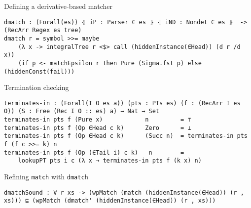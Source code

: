 \documentclass{beamer}
\newcommand{\Agda}[1]{\texttt{\footnotesize #1}\xspace}
\newcommand{\match}{\Agda{match}}
\begin{document}
\begin{frame}[fragile]{Defining a derivative-based matcher}
\begin{verbatim}
dmatch : (Forall(es)) ⦃ iP : Parser ∈ es ⦄ ⦃ iND : Nondet ∈ es ⦄  -> (RecArr Regex es tree)
dmatch r = symbol >>= maybe
    (λ x -> integralTree r <$> call (hiddenInstance(∈Head)) (d r /d x))
    (if p <- matchEpsilon r then Pure (Sigma.fst p) else (hiddenConst(fail)))
\end{verbatim}
\end{frame}


\begin{frame}[fragile]{Termination checking}
\begin{verbatim}
terminates-in : (Forall(I O es a)) (pts : PTs es) (f : (RecArr I es O)) (S : Free (Rec I O :: es) a) → Nat → Set
terminates-in pts f (Pure x)            n         = ⊤
terminates-in pts f (Op ∈Head c k)      Zero      = ⊥
terminates-in pts f (Op ∈Head c k)      (Succ n)  = terminates-in pts f (f c >>= k) n
terminates-in pts f (Op (∈Tail i) c k)   n        =
    lookupPT pts i c (λ x → terminates-in pts f (k x) n)
\end{verbatim}
\end{frame}


\begin{frame}[fragile]{Refining \match with \Agda{dmatch}}
\begin{verbatim}
dmatchSound : ∀ r xs -> (wpMatch (match (hiddenInstance(∈Head)) (r , xs))) ⊑ (wpMatch (dmatch' (hiddenInstance(∈Head)) (r , xs)))
\end{verbatim}
\end{frame}
\end{document}
